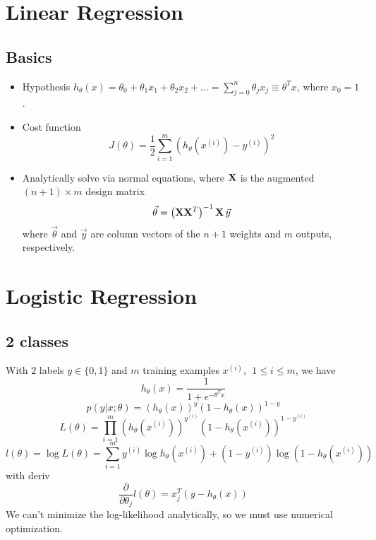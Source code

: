 \documentclass[11pt]{article}
\begin{document}
\newpage
\section{Linear Regression}
\label{sec:linreg}
\subsection{Basics}
\begin{itemize}
  \item Hypothesis $h_\theta(x) = \theta_0 + \theta_1 x_1 + \theta_2 x_2 + \dots
  = \sum_{j=0}^{n} \theta_j x_j \equiv \theta^T x$, where $x_0 = 1$.
  \item Cost function
  \begin{equation}
    J(\theta) = \frac{1}{2} \sum_{i=1}^m \left(h_\theta(x^{(i)}) -
      y^{(i)}\right)^2
  \end{equation}
  \item Analytically solve via normal equations, where $\mathbf{X}$ is the
  augmented $(n+1) \times m$ design matrix
  \begin{equation}
    \vec{\theta} = \left(\mathbf{X} \mathbf{X}^T\right)^{-1} \mathbf{X}\, \vec{y}
  \end{equation}
  where $\vec{\theta}$ and $\vec{y}$ are column vectors of the $n+1$ weights and
  $m$ outputs, respectively.
\end{itemize}



\section{Logistic Regression}
\label{sec:logreg}
\subsection{2 classes}
With 2 labels $y \in \{0,1\}$ and $m$ training examples
$x^{(i)},\ \ 1 \leq i \leq m$, we have
\begin{equation}
  h_\theta (x) = \frac{1}{1 + e^{-\theta^T x}}
\end{equation}
\begin{equation}
  p(y|x;\theta) = (h_\theta (x))^y (1 - h_\theta (x))^{1-y}
\end{equation}
\begin{equation}
  L(\theta) = \prod_{i=1}^m (h_\theta (x^{(i)}))^{y^{(i)}} (1 - h_\theta
  (x^{(i)}))^{1-y^{(i)}}
\end{equation}
\begin{equation}
  l(\theta) = \log L(\theta) = \sum_{i=1}^m y^{(i)} \log h_\theta (x^{(i)}) +
  (1 - y^{(i)}) \log(1 - h_\theta (x^{(i)}))
\end{equation}
with deriv
\begin{equation}
  \frac{\partial}{\partial \theta_j} l(\theta) = x_j^T (y - h_\theta (x))
\end{equation}
We can't minimize the log-likelihood analytically, so we must use numerical
optimization.
\end{document}
